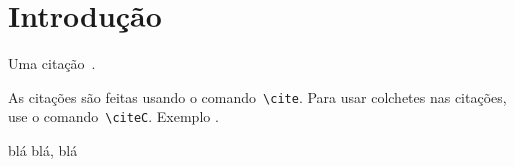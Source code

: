 \chapter{Introdução}

Uma citação~\cite{artigo:2015}.

As citações são feitas usando o comando~\texttt{\textbackslash cite}. Para usar colchetes nas citações, use o comando~\texttt{\textbackslash citeC}. Exemplo .


blá blá, blá \cite{artigo:2015}